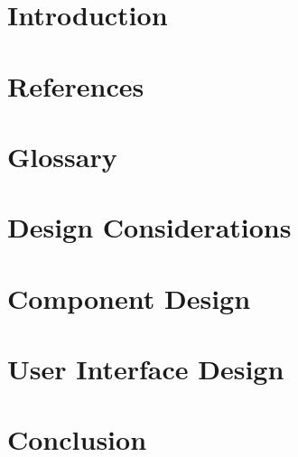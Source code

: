 \documentclass[onecolumn, draftclsnofoot, 10pt, compsoc]{IEEEtran}
\begin{document}
\begin{titlepage}
\begin{singlespace}
{\begin{abstract}
		\end{abstract}
		}
	\end{singlespace}
\end{titlepage}
\newpage
{}
\tableofcontents
\clearpage

\section{Introduction}
\section{References}
\section{Glossary}
\section{Design Considerations}
\section{Component Design}
\section{User Interface Design}
\section{Conclusion}
\end{document}
